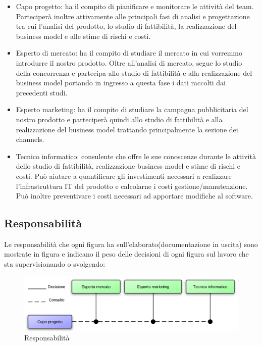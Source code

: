 \vspace*{0.5cm}

\begin{itemize}

\item Capo progetto: ha il compito di pianificare e monitorare le attività del team. Parteciperà inoltre attivamente alle principali fasi di analisi e progettazione tra cui l'analisi del prodotto, lo studio di fattibilità, la realizzazione del business model e alle stime di rischi e costi.

\item Esperto di mercato: ha il compito di studiare il mercato in cui vorremmo introdurre il nostro prodotto. Oltre all'analisi di mercato, segue lo studio della concorrenza e partecipa allo studio di fattibilità e alla realizzazione del business model portando in ingresso a questa fase i dati raccolti dai precedenti studi. 

\item Esperto marketing: ha il compito di studiare la campagna pubblicitaria del nostro prodotto e parteciperà quindi allo studio di fattibilità e alla realizzazione del business model trattando principalmente la sezione dei channels.

\item Tecnico informatico: consulente che offre le sue conoscenze durante le attività dello studio di fattibilità, realizzazione business model e stime di rischi e costi. Può aiutare a quantificare gli investimenti necessari a realizzare l'infrastruttura IT del prodotto e calcolarne i costi gestione/manutenzione. Può inoltre preventivare i costi necessari ad apportare modifiche al software.

\end{itemize}

\subsection{Responsabilità}
Le responsabilità che ogni figura ha sull'elaborato(documentazione in uscita) sono mostrate in figura  e indicano il peso delle decisioni di ogni figura sul lavoro che sta supervisionando o svolgendo:

\vspace*{0.5cm}

\begin{figure}[H]
\centering
\includegraphics[scale=0.8]{images/cap3/resp.png}
\caption{Responsabilità}
\end{figure}

